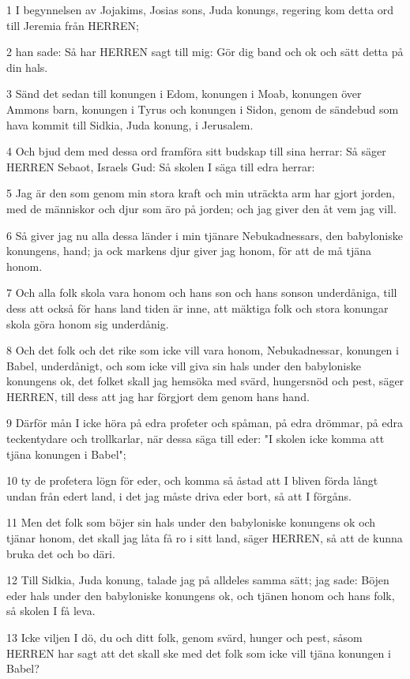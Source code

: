 \par 1 I begynnelsen av Jojakims, Josias sons, Juda konungs, regering kom detta ord till Jeremia från HERREN;
\par 2 han sade: Så har HERREN sagt till mig: Gör dig band och ok och sätt detta på din hals.
\par 3 Sänd det sedan till konungen i Edom, konungen i Moab, konungen över Ammons barn, konungen i Tyrus och konungen i Sidon, genom de sändebud som hava kommit till Sidkia, Juda konung, i Jerusalem.
\par 4 Och bjud dem med dessa ord framföra sitt budskap till sina herrar: Så säger HERREN Sebaot, Israels Gud: Så skolen I säga till edra herrar:
\par 5 Jag är den som genom min stora kraft och min uträckta arm har gjort jorden, med de människor och djur som äro på jorden; och jag giver den åt vem jag vill.
\par 6 Så giver jag nu alla dessa länder i min tjänare Nebukadnessars, den babyloniske konungens, hand; ja ock markens djur giver jag honom, för att de må tjäna honom.
\par 7 Och alla folk skola vara honom och hans son och hans sonson underdåniga, till dess att också för hans land tiden är inne, att mäktiga folk och stora konungar skola göra honom sig underdånig.
\par 8 Och det folk och det rike som icke vill vara honom, Nebukadnessar, konungen i Babel, underdånigt, och som icke vill giva sin hals under den babyloniske konungens ok, det folket skall jag hemsöka med svärd, hungersnöd och pest, säger HERREN, till dess att jag har förgjort dem genom hans hand.
\par 9 Därför mån I icke höra på edra profeter och spåman, på edra drömmar, på edra teckentydare och trollkarlar, när dessa säga till eder: "I skolen icke komma att tjäna konungen i Babel";
\par 10 ty de profetera lögn för eder, och komma så åstad att I bliven förda långt undan från edert land, i det jag måste driva eder bort, så att I förgåns.
\par 11 Men det folk som böjer sin hals under den babyloniske konungens ok och tjänar honom, det skall jag låta få ro i sitt land, säger HERREN, så att de kunna bruka det och bo däri.
\par 12 Till Sidkia, Juda konung, talade jag på alldeles samma sätt; jag sade: Böjen eder hals under den babyloniske konungens ok, och tjänen honom och hans folk, så skolen I få leva.
\par 13 Icke viljen I dö, du och ditt folk, genom svärd, hunger och pest, såsom HERREN har sagt att det skall ske med det folk som icke vill tjäna konungen i Babel?
